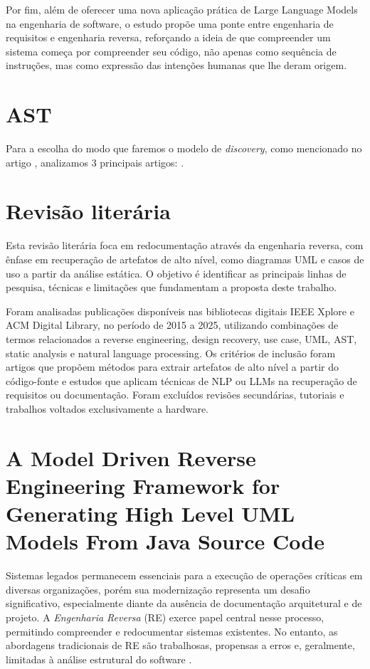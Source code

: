 \documentclass[12pt,a4paper]{article}
\begin{document}
Por fim, além de oferecer uma nova aplicação prática de Large Language Models na engenharia de software, o estudo propõe uma ponte entre engenharia de requisitos e engenharia reversa, reforçando a ideia de que compreender um sistema começa por compreender seu código, não apenas como sequência de instruções, mas como expressão das intenções humanas que lhe deram origem.

\section{AST}
Para a escolha do modo que faremos o modelo de \textit{discovery}, como mencionado no artigo \textcite{Bruneliere2010MoDisco}, analizamos 3 principais artigos: \textcite{feng2020codebert, feng2020codebert, ngo2023exploring}.

\section{Revisão literária}
Esta revisão literária foca em redocumentação através da engenharia reversa, com ênfase em recuperação de artefatos de alto nível, como diagramas UML e casos de uso a partir da análise estática. O objetivo é identificar as principais linhas de pesquisa, técnicas e limitações que fundamentam a proposta deste trabalho.

Foram analisadas publicações disponíveis nas bibliotecas digitais IEEE Xplore e ACM Digital Library, no período de 2015 a 2025, utilizando combinações de termos relacionados a reverse engineering, design recovery, use case, UML, AST, static analysis e natural language processing. Os critérios de inclusão foram artigos que propõem métodos para extrair artefatos de alto nível a partir do código-fonte e estudos que aplicam técnicas de NLP ou LLMs na recuperação de requisitos ou documentação. Foram excluídos revisões secundárias, tutoriais e trabalhos voltados exclusivamente a hardware.

\section{A Model Driven Reverse Engineering Framework for Generating High Level UML Models From Java Source Code}

Sistemas legados permanecem essenciais para a execução de operações críticas em diversas organizações, porém sua modernização representa um desafio significativo, especialmente diante da ausência de documentação arquitetural e de projeto. A \textit{Engenharia Reversa} (RE) exerce papel central nesse processo, permitindo compreender e redocumentar sistemas existentes. No entanto, as abordagens tradicionais de RE são trabalhosas, propensas a erros e, geralmente, limitadas à análise estrutural do software \textcite{Sabir2019MDRE}.
\end{document}
